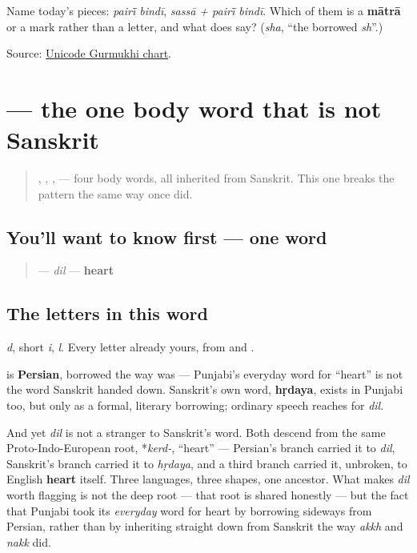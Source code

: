 \begin{tcolorbox}[breakable,colback=teal!4,colframe=teal!35!black,title={Before you move on}]
Name today's pieces: \emph{pairī̃ bindī}, \emph{sassā + pairī̃ bindī}. Which of them is a \textbf{mātrā} or a mark rather than a letter, and what does \textbf{} say? (\emph{sha}, “the borrowed \emph{sh}”.)

Source: \href{https://www.unicode.org/charts/PDF/U0A00.pdf}{Unicode Gurmukhi chart}.
\end{tcolorbox}
\section[\texorpdfstring{\pa{ਦਿਲ} (dil)}{ਦਿਲ (dil)}]{ — the one body word that is not Sanskrit}

\label{lesson:PA-C13-dil}



\begin{quote}
\textbf{}, \textbf{}, \textbf{}, \textbf{} — four body words, all inherited from Sanskrit. This one breaks the pattern the same way \textbf{} once did.
\end{quote}

\subsection*{You'll want to know first — one word}
\begin{quote}
\textbf{} — \emph{dil} — \textbf{heart}
\end{quote}

\subsection*{The letters in this word}
\textbf{} \emph{d}, \textbf{} short \emph{i}, \textbf{} \emph{l}. Every letter already yours, from \textbf{} and \textbf{}.

\begin{cousinweb}
\textbf{} is \textbf{Persian}, borrowed the way \textbf{} was — Punjabi's everyday word for \textquotedblleft{}heart\textquotedblright{} is not the word Sanskrit handed down. Sanskrit's own word, \textbf{hṛdaya}, exists in Punjabi too, but only as a formal, literary borrowing; ordinary speech reaches for \emph{dil}.

And yet \emph{dil} is not a stranger to Sanskrit's word. Both descend from the same Proto-Indo-European root, *\emph{kerd-}, \textquotedblleft{}heart\textquotedblright{} — Persian's branch carried it to \emph{dil}, Sanskrit's branch carried it to \emph{hṛdaya}, and a third branch carried it, unbroken, to English \textbf{heart} itself. Three languages, three shapes, one ancestor. What makes \emph{dil} worth flagging is not the deep root — that root is shared honestly — but the fact that Punjabi took its \emph{everyday} word for heart by borrowing sideways from Persian, rather than by inheriting straight down from Sanskrit the way \emph{akkh} and \emph{nakk} did.
\end{cousinweb}

